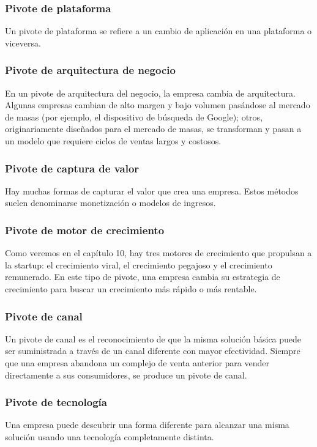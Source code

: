 \documentclass[10pt]{article}
\begin{document}
\begin{multicols}{2}
\subsubsection*{Pivote de plataforma}
Un pivote de plataforma se refiere a un cambio de aplicación en una plataforma o viceversa.
\subsubsection*{Pivote de arquitectura de negocio}
 En un pivote
de arquitectura del negocio, la empresa cambia de arquitectura. Algunas empresas cambian de alto margen y bajo volumen pasándose al mercado de masas (por ejemplo, el dispositivo de búsqueda de Google); otros, originariamente diseñados para el mercado de masas, se transforman y pasan a un modelo que requiere ciclos de ventas largos y costosos.
\subsubsection*{Pivote de captura de valor}
Hay muchas formas de capturar el valor que crea una empresa. Estos métodos suelen denominarse monetización o modelos de ingresos.
\subsubsection*{Pivote de motor de crecimiento}
Como veremos en el capítulo 10, hay tres motores de crecimiento que propulsan a la startup: el crecimiento viral, el crecimiento pegajoso y el crecimiento remunerado. En este tipo de pivote, una empresa cambia su estrategia de crecimiento para buscar un crecimiento más rápido o más rentable.
\subsubsection{Pivote de canal}
Un pivote de canal es el reconocimiento de que la misma solución básica puede ser suministrada a través de un canal diferente con mayor efectividad. Siempre que una empresa abandona un complejo de venta anterior para vender directamente a sus consumidores, se produce un pivote de canal.
\subsubsection*{Pivote de tecnología}
Una empresa puede descubrir una forma diferente para alcanzar una misma solución usando una tecnología completamente distinta.

\end{multicols}
\end{document}
